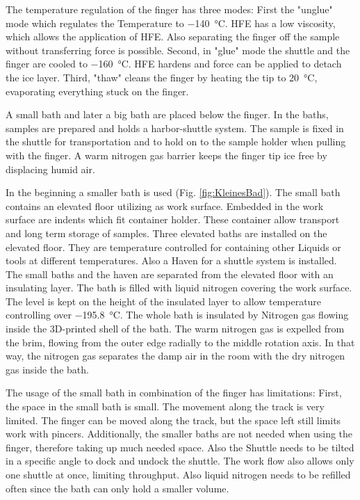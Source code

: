 The temperature regulation of the finger has three modes: First the "unglue" mode which regulates the Temperature to \SI{-140}{\degreeCelsius}. HFE has a low viscosity, which allows the application of HFE. Also separating the finger off the sample without transferring force is possible. Second, in "glue" mode the shuttle and the finger are cooled to \SI{-160}{\degreeCelsius}. HFE hardens and force can be applied to detach the ice layer. Third, "thaw" cleans the finger by heating the tip to \SI{20}{\degreeCelsius}, evaporating everything stuck on the finger.

A small bath and later a big bath are placed below the finger. In the baths, samples are prepared and holds a harbor-shuttle system. The sample is fixed in the shuttle for transportation and to hold on to the sample holder when pulling with the finger. A warm nitrogen gas barrier keeps the finger tip ice free by displacing humid air.

In the beginning a smaller bath is used (Fig. \ref{fig:KleinesBad}). The small bath contains an elevated floor utilizing as work surface. Embedded in the work surface are indents which fit container holder. These container allow transport and long term storage of samples. Three elevated baths are installed on the elevated floor. They are temperature controlled for containing other Liquids or tools at different temperatures. Also a Haven for a shuttle system is installed. The small baths and the haven are separated from the elevated floor with an insulating layer. The bath is filled with liquid nitrogen covering the work surface. The level is kept on the height of the insulated layer to allow temperature controlling over \SI{-195.8}{\degreeCelsius}. The whole bath is insulated by Nitrogen gas flowing inside the 3D-printed shell of the bath. The warm nitrogen gas is expelled from the brim, flowing from the outer edge radially to the middle rotation axis. In that way, the nitrogen gas separates the damp air in the room with the dry nitrogen gas inside the bath.

The usage of the small bath in combination of the finger has limitations: First, the space in the small bath is small. The movement along the track is very limited. The finger can be moved along the track, but the space left still limits work with pincers. Additionally, the smaller baths are not needed when using the finger, therefore taking up much needed space. Also the Shuttle needs to be tilted in a specific angle to dock and undock the shuttle. The work flow also allows only one shuttle at once, limiting throughput. Also liquid nitrogen needs to be refilled often since the bath can only hold a smaller volume.

